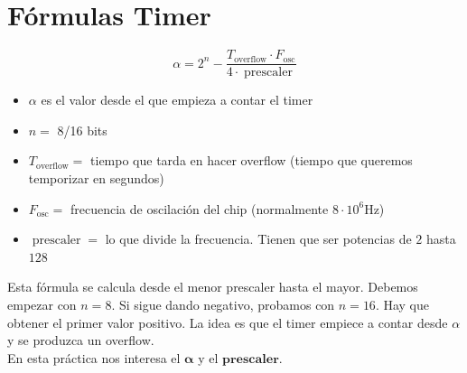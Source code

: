 \documentclass{article}
\theoremstyle{definition} %
\begin{document}
  


\newpage
\section{Fórmulas Timer}
\large
\[\alpha = 2^n - \dfrac{T_{\text{overflow}} \cdot F_{\text{osc}}}{4 \cdot \operatorname{prescaler}}\] 
\normalsize
\begin{itemize}
  

\item $\alpha$ es el valor desde el que empieza a contar el timer

\item $n = $ 8/16 bits 

\item $T_{\text{overflow}} =$ tiempo que tarda en hacer overflow (tiempo que queremos temporizar en segundos)

 \item $F_{\text{osc}} = $ frecuencia de oscilación del chip (normalmente $8 \cdot 10^6$Hz) 

\item $\operatorname{prescaler} = $ lo que divide la frecuencia. Tienen que ser potencias de $2$ hasta $128$ 


\end{itemize}
\begin{center}

\end{center}
Esta fórmula se calcula desde el menor prescaler hasta el mayor. Debemos empezar con $n = 8$. Si sigue dando negativo, probamos con $n = 16$. 
Hay que obtener el primer valor positivo. La idea es que el timer empiece a contar desde $\alpha$ y se produzca un overflow.
\\
En esta práctica nos interesa el $\boldsymbol{\alpha}$ y el $\mathbf{prescaler}$.
\end{document}
